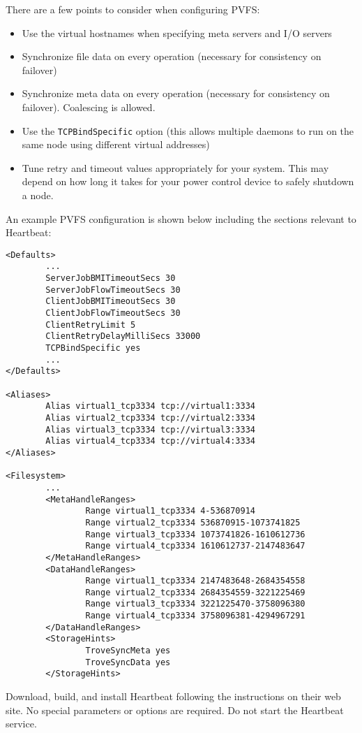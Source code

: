 \documentclass[11pt]{article}
\begin{document}
There are a few points to consider when configuring PVFS:
\begin{itemize}
\item Use the virtual hostnames when specifying meta servers and I/O
servers
\item Synchronize file data on every operation (necessary for consistency on
failover)
\item Synchronize meta data on every operation (necessary for consistency on
failover).  Coalescing is allowed.
\item Use the \texttt{TCPBindSpecific} option (this allows multiple daemons to
run on the same node using different virtual addresses)
\item Tune retry and timeout values appropriately for your system.  This
may depend on how long it takes for your power control device to safely
shutdown a node.
\end{itemize}

An example PVFS configuration is shown below including the sections
relevant to Heartbeat:

\begin{verbatim}
<Defaults>
        ...
        ServerJobBMITimeoutSecs 30
        ServerJobFlowTimeoutSecs 30
        ClientJobBMITimeoutSecs 30
        ClientJobFlowTimeoutSecs 30
        ClientRetryLimit 5
        ClientRetryDelayMilliSecs 33000
        TCPBindSpecific yes
        ...
</Defaults>

<Aliases>
        Alias virtual1_tcp3334 tcp://virtual1:3334
        Alias virtual2_tcp3334 tcp://virtual2:3334
        Alias virtual3_tcp3334 tcp://virtual3:3334
        Alias virtual4_tcp3334 tcp://virtual4:3334
</Aliases>

<Filesystem>
        ...
        <MetaHandleRanges>
                Range virtual1_tcp3334 4-536870914
                Range virtual2_tcp3334 536870915-1073741825
                Range virtual3_tcp3334 1073741826-1610612736
                Range virtual4_tcp3334 1610612737-2147483647
        </MetaHandleRanges>
        <DataHandleRanges>
                Range virtual1_tcp3334 2147483648-2684354558
                Range virtual2_tcp3334 2684354559-3221225469
                Range virtual3_tcp3334 3221225470-3758096380
                Range virtual4_tcp3334 3758096381-4294967291
        </DataHandleRanges>
        <StorageHints>
                TroveSyncMeta yes
                TroveSyncData yes
        </StorageHints>
\end{verbatim}

Download, build, and install Heartbeat following the instructions on
their web site.  No special parameters or options are required.  Do not
start the Heartbeat service.
\end{document}
